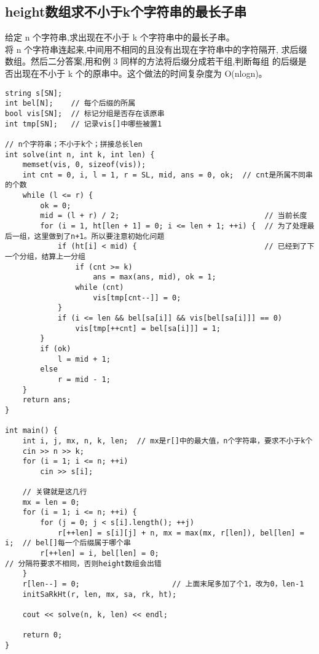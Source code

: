     \subsection{height数组求不小于k个字符串的最长子串}
        给定 n 个字符串,求出现在不小于 k 个字符串中的最长子串。\\
        将 n 个字符串连起来,中间用不相同的且没有出现在字符串中的字符隔开,
        求后缀数组。然后二分答案,用和例 3 同样的方法将后缀分成若干组,判断每组
        的后缀是否出现在不小于 k 个的原串中。这个做法的时间复杂度为 O(nlogn)。
\begin{lstlisting}
string s[SN];
int bel[N];    // 每个后缀的所属
bool vis[SN];  // 标记分组是否存在该原串
int tmp[SN];   // 记录vis[]中哪些被置1

// n个字符串；不小于k个；拼接总长len
int solve(int n, int k, int len) {
    memset(vis, 0, sizeof(vis));
    int cnt = 0, i, l = 1, r = SL, mid, ans = 0, ok;  // cnt是所属不同串的个数
    while (l <= r) {
        ok = 0;
        mid = (l + r) / 2;                                 // 当前长度
        for (i = 1, ht[len + 1] = 0; i <= len + 1; ++i) {  // 为了处理最后一组，这里做到了n+1。所以要注意初始化问题
            if (ht[i] < mid) {                             // 已经到了下一个分组，结算上一分组
                if (cnt >= k)
                    ans = max(ans, mid), ok = 1;
                while (cnt)
                    vis[tmp[cnt--]] = 0;
            }
            if (i <= len && bel[sa[i]] && vis[bel[sa[i]]] == 0)
                vis[tmp[++cnt] = bel[sa[i]]] = 1;
        }
        if (ok)
            l = mid + 1;
        else
            r = mid - 1;
    }
    return ans;
}

int main() {
    int i, j, mx, n, k, len;  // mx是r[]中的最大值，n个字符串，要求不小于k个
    cin >> n >> k;
    for (i = 1; i <= n; ++i)
        cin >> s[i];

    // 关键就是这几行
    mx = len = 0;
    for (i = 1; i <= n; ++i) {
        for (j = 0; j < s[i].length(); ++j)
            r[++len] = s[i][j] + n, mx = max(mx, r[len]), bel[len] = i;  // bel[]每一个后缀属于哪个串
        r[++len] = i, bel[len] = 0;                                      // 分隔符要求不相同，否则height数组会出错
    }
    r[len--] = 0;                     // 上面末尾多加了个1，改为0，len-1
    initSaRkHt(r, len, mx, sa, rk, ht);

    cout << solve(n, k, len) << endl;

    return 0;
}
\end{lstlisting}

